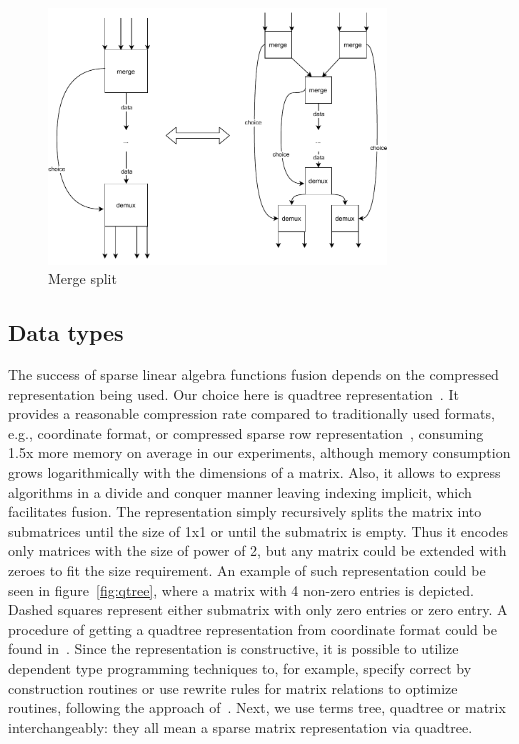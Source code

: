 \begin{figure}
    \centering
    \includegraphics[width=0.8\textwidth]{figures/compressChoice.pdf}
    \caption{Merge split}
    \label{fig:compressChoice}
\end{figure}

\subsection{Data types}

The success of sparse linear algebra functions fusion depends on the compressed representation being used. Our choice here is quadtree representation~\cite{qtree}. It provides a reasonable compression rate compared to traditionally used formats, e.g., coordinate format, or compressed sparse row representation~\cite{GAILLA}, consuming 1.5x more memory on average in our experiments, although memory consumption grows logarithmically with the dimensions of a matrix. Also, it allows to express algorithms in a divide and conquer manner leaving indexing implicit, which facilitates fusion. The representation simply recursively splits the matrix into submatrices until the size of 1x1 or until the submatrix is empty. Thus it encodes only matrices with the size of power of 2, but any matrix could be extended with zeroes to fit the size requirement. An example of such representation could be seen in figure~\ref{fig:qtree}, where a matrix with 4 non-zero entries is depicted. Dashed squares represent either submatrix with only zero entries or zero entry. A procedure of getting a quadtree representation from coordinate format could be found in~\cite{matrix-rep}. Since the representation is constructive, it is possible to utilize dependent type programming techniques to, for example, specify correct by construction routines or use rewrite rules for matrix relations to optimize routines, following the approach of~\cite{typeyourmatricesforgreatgood}. Next, we use terms tree, quadtree or matrix interchangeably: they all mean a sparse matrix representation via quadtree. 

